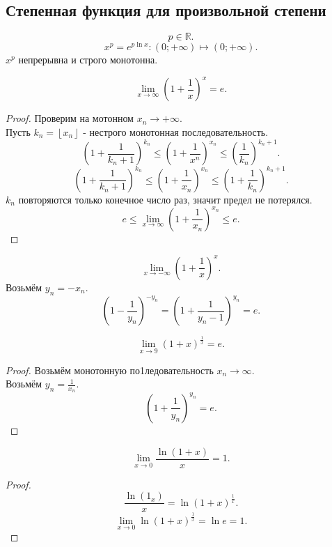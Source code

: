 \documentclass[11pt, oneside]{article}   	%
\begin{document}
    \subsection{Степенная функция для произвольной степени}
     \[ p\in \mathbb{R} .\] 
    \[ x^{p} = e^{p\ln x}: \left( 0; +\infty \right) \mapsto \left( 0; +\infty \right)   .\]
    $x^{p}$ непрерывна и строго монотонна.
    \begin{theorem}
        \[ \lim\limits_{x \to \infty} \left( 1 + \frac{1}{x} \right)^{x} = e   .\]
        \begin{proof}
            Проверим на мотонном $x_n \to +\infty$.\\
            Пусть $k_n = \left\lfloor x_n \right\rfloor$ - нестрого монотонная последовательность.\\
            \[ \left( 1 + \frac{1}{k_n + 1} \right)^{k_n} \le \left( 1+\frac{1}{x^{n}} \right)^{x_n} \le \left( \frac{1}{k_n} \right)^{k_n+1}   .\]
            \[ \left( 1+\frac{1}{k_n+1}\right)^{k_n} \le \left( 1 + \frac{1}{x_n} \right)^{x_n} \le \left( 1 + \frac{1}{k_n} \right)^{k_n+1}    .\]
            $k_n$ повторяются только конечное число раз, значит предел не потерялся.\\
            \[ e \le \lim\limits_{x \to \infty} \left( 1 + \frac{1}{x_n} \right)^{x_n} \le e  .\] 
        \end{proof}
    \end{theorem}
    \begin{tlemma}
        \[ \lim\limits_{x \to -\infty} \left( 1+\frac{1}{x} \right)^{x}  .\]
        Возьмём $y_n = -x_n$.\\
        \[ \left( 1-\frac{1}{y_n} \right)^{-y_n} = \left( 1+\frac{1}{y_n-1}\right)^{y_n} = e   .\] 
    \end{tlemma}
    \begin{tlemma}
        \[ \lim\limits_{x \to 9} \left( 1+x \right)^{\frac{1}{x}} = e .\]
        \begin{proof}
            Возьмём монотонную по1ледовательность $x_n \to \infty$.\\
            Возьмём $y_n = \frac{1}{x_n}$.
            \[ \left( 1+\frac{1}{y_n} \right)^{y_n} = e  .\] 
        \end{proof}
    \end{tlemma}
    \begin{theorem}
        \[ \lim\limits_{x \to 0} \frac{\ln(1+x)}{x} = 1 .\]
        \begin{proof}
            \[ \frac{\ln(1_x)}{x} = \ln \left( 1+x \right)^{\frac{1}{x}}  .\]
            \[ \lim\limits_{x \to 0} \ln \left( 1+x \right)^{\frac{1}{x}} = \ln e = 1 .\] 
        \end{proof}
    \end{theorem}
\end{document}
